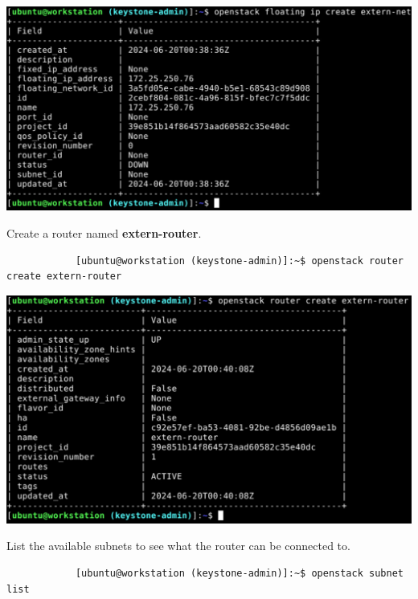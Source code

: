 \documentclass[letterpaper, 12pt]{article}
\begin{document}
\begin{enumerate}
\begin{labstep}
        \begin{center}
            \includegraphics[width=\linewidth]{images/part1/step15.png}
        \end{center}
    \end{labstep}

    \begin{labstep}
        Create a router named \textbf{extern-router}.
        \begin{lstlisting}
            [ubuntu@workstation (keystone-admin)]:~$ openstack router create extern-router
        \end{lstlisting}

        \begin{center}
            \includegraphics[width=\linewidth]{images/part1/step16.png}
        \end{center}
    \end{labstep}

    \begin{labstep}
        List the available subnets to see what the router can be connected to.
        \begin{lstlisting}
            [ubuntu@workstation (keystone-admin)]:~$ openstack subnet list
        \end{lstlisting}


\end{labstep}
\end{enumerate}
\end{document}
